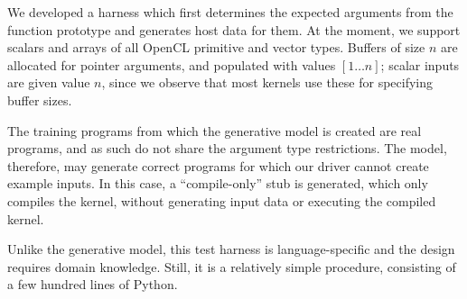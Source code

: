 
We developed a harness which first determines the expected arguments from the function prototype and generates host data for them. At the moment, we support scalars and arrays of all OpenCL primitive and vector types. Buffers of size $n$ are allocated for pointer arguments, and populated with values {$[1 \ldots n]$}; scalar inputs are given value $n$, since we observe that most kernels use these for specifying buffer sizes. 

The training programs from which the generative model is created are real programs, and as such do not share the argument type restrictions. The model, therefore, may generate correct programs for which our driver cannot create example inputs. In this case, a ``compile-only'' stub is generated, which only compiles the kernel, without generating input data or executing the compiled kernel. 

Unlike the generative model, this test harness is language-specific and the design requires domain knowledge. Still, it is a relatively simple procedure, consisting of a few hundred lines of Python.


